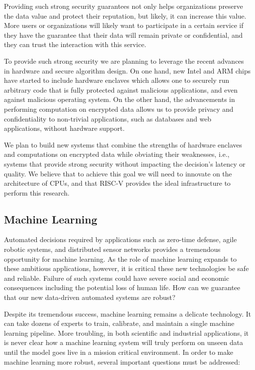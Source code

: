 Providing such strong security guarantees not only helps organizations preserve the data value and protect their reputation, but likely, it can increase this value. More users or organizations will likely want to participate in a certain service if they have the guarantee that their data will remain private or confidential, and they can trust the interaction with this service.
                                               
To provide such strong security we are planning to leverage the recent advances in hardware and secure algorithm design. On one hand, new Intel and ARM chips have started to include hardware enclaves which allows one to securely run arbitrary code that is fully protected against malicious applications, and even against malicious operating system.  On the other hand, the advancements in performing computation on encrypted data allows us to provide privacy and confidentiality to non-trivial applications, such as databases and web applications, without hardware support. 

We plan to build new systems that combine the strengths of hardware enclaves and computations on encrypted data while obviating their weaknesses, i.e., systems that provide strong security without impacting the decision's latency or quality. We believe that to achieve this goal we will need to innovate on the architecture of CPUs, and that RISC-V provides the ideal infrastructure to perform this research.

\subsection{Machine Learning} 

Automated decisions required by applications such as zero-time defense, agile robotic systems, and distributed sensor networks provides a tremendous opportunity for machine learning. As the role of machine learning expands to these ambitious applications, however, it is critical these new technologies be safe and reliable.  Failure of such systems could have severe social and economic consequences including the potential loss of human life. How can we guarantee that our new data-driven automated systems are robust?

Despite its tremendous success, machine learning remains a delicate technology. It can take dozens of experts to train, calibrate, and maintain a single machine learning pipeline. More troubling, in both scientific and industrial applications, it is never clear how a machine learning system will truly perform on unseen data until the model goes live in a mission critical environment. In order to make machine learning more robust, several important questions must be addressed:

